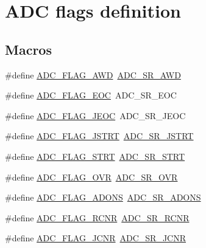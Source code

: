 \hypertarget{group___a_d_c__flags__definition}{\section{A\-D\-C flags definition}
\label{group___a_d_c__flags__definition}
}
\subsection*{Macros}
\begin{DoxyCompactItemize}
\item 
\#define \hyperlink{group___a_d_c__flags__definition_gadb75a4b430fb84950232b7a8f3a6a877}{A\-D\-C\-\_\-\-F\-L\-A\-G\-\_\-\-A\-W\-D}~\hyperlink{group___peripheral___registers___bits___definition_ga8b7f27694281e4cad956da567e5583b2}{A\-D\-C\-\_\-\-S\-R\-\_\-\-A\-W\-D}
\item 
\#define \hyperlink{group___a_d_c__flags__definition_gaf2c6fdf7e9ab63b778149e5fb56413d4}{A\-D\-C\-\_\-\-F\-L\-A\-G\-\_\-\-E\-O\-C}~A\-D\-C\-\_\-\-S\-R\-\_\-\-E\-O\-C
\item 
\#define \hyperlink{group___a_d_c__flags__definition_ga4df8eea8ab83d98104ee15a339743a4e}{A\-D\-C\-\_\-\-F\-L\-A\-G\-\_\-\-J\-E\-O\-C}~A\-D\-C\-\_\-\-S\-R\-\_\-\-J\-E\-O\-C
\item 
\#define \hyperlink{group___a_d_c__flags__definition_ga278f4e866f4322c1120bf0db5301c432}{A\-D\-C\-\_\-\-F\-L\-A\-G\-\_\-\-J\-S\-T\-R\-T}~\hyperlink{group___peripheral___registers___bits___definition_ga7340a01ffec051c06e80a037eee58a14}{A\-D\-C\-\_\-\-S\-R\-\_\-\-J\-S\-T\-R\-T}
\item 
\#define \hyperlink{group___a_d_c__flags__definition_gad0c59ae7749c69b5b91f2c533db1b619}{A\-D\-C\-\_\-\-F\-L\-A\-G\-\_\-\-S\-T\-R\-T}~\hyperlink{group___peripheral___registers___bits___definition_ga45eb11ad986d8220cde9fa47a91ed222}{A\-D\-C\-\_\-\-S\-R\-\_\-\-S\-T\-R\-T}
\item 
\#define \hyperlink{group___a_d_c__flags__definition_ga6e8f399d2af342bd18b9f5803cb986e7}{A\-D\-C\-\_\-\-F\-L\-A\-G\-\_\-\-O\-V\-R}~\hyperlink{group___peripheral___registers___bits___definition_ga1e5211d5e3e53cdedf4d9d6fe4ce2a45}{A\-D\-C\-\_\-\-S\-R\-\_\-\-O\-V\-R}
\item 
\#define \hyperlink{group___a_d_c__flags__definition_gacb78403e0c91e0ff5185ad245ff3005d}{A\-D\-C\-\_\-\-F\-L\-A\-G\-\_\-\-A\-D\-O\-N\-S}~\hyperlink{group___peripheral___registers___bits___definition_ga8833ced601371447a7628e2728232410}{A\-D\-C\-\_\-\-S\-R\-\_\-\-A\-D\-O\-N\-S}
\item 
\#define \hyperlink{group___a_d_c__flags__definition_gacbe1105dc196e6d61754d4c163fd7f0b}{A\-D\-C\-\_\-\-F\-L\-A\-G\-\_\-\-R\-C\-N\-R}~\hyperlink{group___peripheral___registers___bits___definition_ga3dfdc63f9c9da0cd3fed797efff2fa20}{A\-D\-C\-\_\-\-S\-R\-\_\-\-R\-C\-N\-R}
\item 
\#define \hyperlink{group___a_d_c__flags__definition_ga77ed2f206462c4512d6e093f15016c35}{A\-D\-C\-\_\-\-F\-L\-A\-G\-\_\-\-J\-C\-N\-R}~\hyperlink{group___peripheral___registers___bits___definition_ga2b6c708a799e6e9ecbc267f158ffc1b4}{A\-D\-C\-\_\-\-S\-R\-\_\-\-J\-C\-N\-R}
\end{DoxyCompactItemize}


